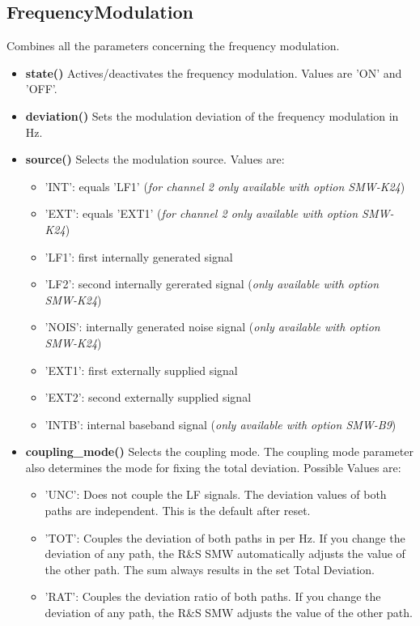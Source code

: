 \documentclass[11pt]{article} %
\begin{document}
\subsection{FrequencyModulation}

Combines all the parameters concerning the frequency modulation.
\begin{itemize}
\item {\bf state()} Actives/deactivates the frequency modulation. Values are 'ON' and 'OFF'.
\item {\bf deviation()} Sets the modulation deviation of the frequency modulation in Hz.
\item {\bf source()} Selects the modulation source. Values are:
	\begin{itemize}[]
	\item 'INT': equals 'LF1' ({\it for channel 2 only available with option SMW-K24})
	\item 'EXT': equals 'EXT1' ({\it for channel 2 only available with option SMW-K24})
	\item 'LF1': first internally generated signal
	\item 'LF2': second internally gererated signal ({\it only available with option SMW-K24})
	\item 'NOIS': internally generated noise signal ({\it only available with option SMW-K24})
	\item 'EXT1': first externally supplied signal
	\item 'EXT2': second externally supplied signal
	\item 'INTB': internal baseband signal ({\it only available with option SMW-B9})
	\end{itemize}
\item {\bf coupling\_mode()} Selects the coupling mode. The coupling mode parameter also determines the mode for fixing the total deviation. Possible Values are:
	\begin{itemize}[]
	\item 'UNC': Does not couple the LF signals. The deviation values of both paths are independent. This is the default after reset.
	\item 'TOT': Couples the deviation of both paths in per Hz. If you change the deviation of any path, the R\&S SMW automatically adjusts the value of the other path. The sum always results in the set Total Deviation.
	\item 'RAT': Couples the deviation ratio of both paths. If you change the deviation of any path, the R\&S SMW adjusts the value of the other path.

\end{itemize}
\end{itemize}
\end{document}
